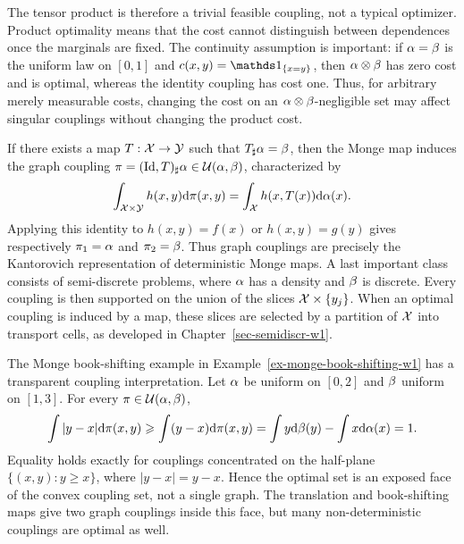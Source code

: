 The tensor product is therefore a trivial feasible coupling, not a typical optimizer. Product optimality means that the cost cannot distinguish between dependences once the marginals are fixed. The continuity assumption is important: if $\alpha=\beta$ is the uniform law on $[0,1]$ and $c(x,y)=\ones_{\{x=y\}}$, then $\alpha\otimes\beta$ has zero cost and is optimal, whereas the identity coupling has cost one. Thus, for arbitrary merely measurable costs, changing the cost on an $\alpha\otimes\beta$-negligible set may affect singular couplings without changing the product cost.

If there exists a map $T:\mathcal{X}\to\mathcal{Y}$ such that $T_\sharp\alpha=\beta$, then the Monge map induces the graph coupling $\pi=(\mathrm{Id},T)_\sharp\alpha\in\mathcal{U}(\alpha,\beta)$, characterized by
\[
	\int_{\mathcal{X}\times\mathcal{Y}} h(x,y)\mathrm{d}\pi(x,y)
	=
	\int_{\mathcal{X}} h(x,T(x))\mathrm{d}\alpha(x).
\]
Applying this identity to $h(x,y)=f(x)$ or $h(x,y)=g(y)$ gives respectively $\pi_1=\alpha$ and $\pi_2=\beta$. Thus graph couplings are precisely the Kantorovich representation of deterministic Monge maps.
A last important class consists of semi-discrete problems, where $\alpha$ has a density and $\beta$ is discrete. Every coupling is then supported on the union of the slices $\mathcal{X}\times\{y_j\}$. When an optimal coupling is induced by a map, these slices are selected by a partition of $\mathcal{X}$ into transport cells, as developed in Chapter~\ref{sec-semidiscr-w1}.

\begin{rem}\label{rem-kantorovich-book-shifting}
	The Monge book-shifting example in Example~\ref{ex-monge-book-shifting-w1} has a transparent coupling interpretation. Let $\alpha$ be uniform on $[0,2]$ and $\beta$ uniform on $[1,3]$. For every $\pi\in\mathcal{U}(\alpha,\beta)$,
	\[
		\int |y-x|\mathrm{d}\pi(x,y)
		\geqslant
		\int (y-x)\mathrm{d}\pi(x,y)
		=
		\int y\mathrm{d}\beta(y)-\int x\mathrm{d}\alpha(x)
		=1.
	\]
	Equality holds exactly for couplings concentrated on the half-plane $\{(x,y):y\geq x\}$, where $|y-x|=y-x$. Hence the optimal set is an exposed face of the convex coupling set, not a single graph. The translation and book-shifting maps give two graph couplings inside this face, but many non-deterministic couplings are optimal as well.
\end{rem}

